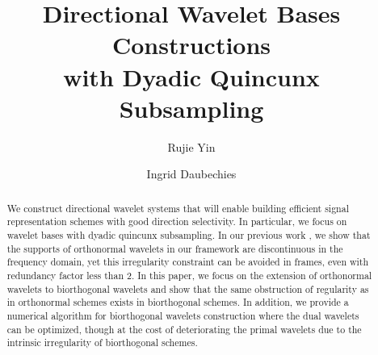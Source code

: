 \documentclass[]{article}
\begin{document}
\newtheorem{lem}{Lemma}
\newtheorem*{mydef}{Definition}
\newtheorem{thm}{Theorem}
\newtheorem{prop}{Proposition}
\newtheorem*{notat}{Notation}

\abovedisplayskip=2pt
\belowdisplayskip=2pt
\abovedisplayshortskip=2pt
\belowdisplayshortskip=2pt


\title{Directional Wavelet Bases Constructions \\with Dyadic Quincunx Subsampling}
\author[1]{Rujie Yin}
\author[2]{Ingrid Daubechies}
\date{}
\maketitle

\begin{abstract}
We construct directional wavelet systems that will enable building efficient signal representation schemes with good direction selectivity. In particular, we focus on wavelet bases with dyadic quincunx subsampling.
In our previous work \cite{yin2014orthshear}, we show that the supports of orthonormal wavelets in our framework are discontinuous in the frequency domain, yet this irregularity constraint can be avoided in frames, even with redundancy factor less than 2. In this paper, we focus on the extension of orthonormal wavelets to biorthogonal wavelets and show that the same obstruction of regularity as in orthonormal schemes exists in biorthogonal schemes. In addition, we provide a numerical algorithm for biorthogonal wavelets construction where the dual wavelets can be optimized, though at the cost of deteriorating the primal wavelets due to the intrinsic irregularity of biorthogonal schemes.
\end{abstract}
\end{document}
